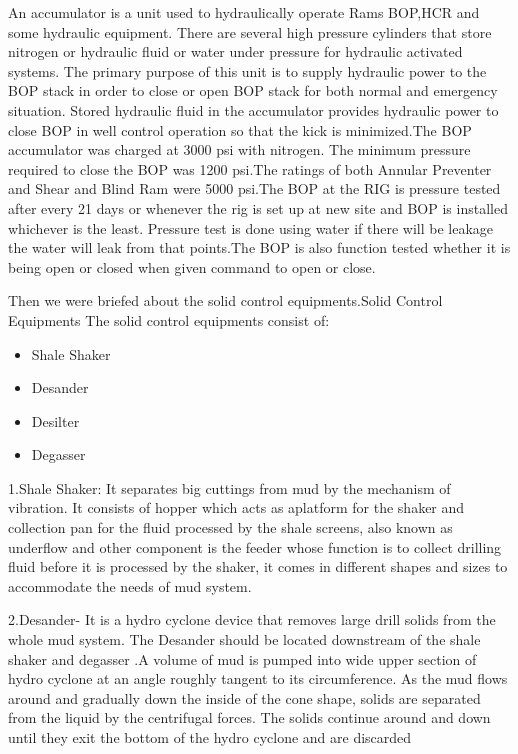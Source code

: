 An accumulator is a unit used to hydraulically operate Rams BOP,HCR and some hydraulic equipment. There are several high pressure cylinders that store nitrogen or hydraulic fluid or water under pressure for hydraulic activated systems. The primary purpose of this unit is to supply hydraulic power to the BOP stack in order to close or open BOP stack for both normal and emergency situation. Stored hydraulic fluid in the accumulator provides hydraulic power to close BOP in well control operation so that the kick is minimized.The BOP accumulator was charged at 3000 psi with nitrogen. The minimum pressure required to close the BOP was 1200 psi.The ratings of both Annular Preventer and Shear and Blind Ram were 5000 psi.The BOP at the RIG is pressure tested after every 21 days or whenever the rig is set up at new site and BOP is installed whichever is the least. Pressure test is done using water if there will be leakage the water will leak from that points.The BOP is also function tested whether it is being open or closed when given command to open or close.


\noindent Then we were briefed about the solid control equipments.Solid Control Equipments The solid control equipments consist of:

\begin{itemize}

\item Shale Shaker
\item Desander
\item Desilter
\item Degasser

\end{itemize}


\noindent 1.Shale Shaker: It separates big cuttings from mud by the mechanism of vibration. 
It consists of hopper which acts as aplatform for the shaker and collection 
pan for the fluid processed by the shale screens, also known as underflow 
and other component is the feeder whose function is to collect drilling fluid
before it is processed by the shaker, it comes in different shapes
and sizes to accommodate the needs of mud system.

\vspace{1em}

\noindent 2.Desander- It is a hydro cyclone device that removes large drill
solids from the whole mud system. The Desander should be
located downstream of the shale shaker and degasser .A volume of
mud is pumped into wide upper section of hydro cyclone at an
angle roughly tangent to its circumference. As the mud flows
around and gradually down the inside of the cone shape, solids are
separated from the liquid by the centrifugal forces. The solids
continue around and down until they exit the bottom of the hydro
cyclone and are discarded


